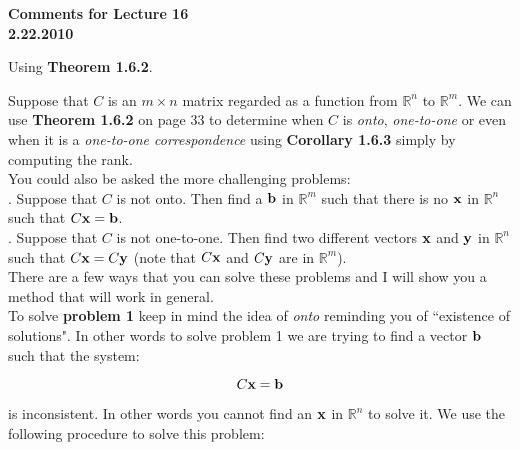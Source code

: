 \documentclass[12pt]{article}
\begin{document}
\begin{center}
{\large \bf Comments for Lecture 16}\\
\bf{2.22.2010}
\end{center}

\begin{center}
Using {\bf Theorem 1.6.2}.
\end{center}

\noindent Suppose that $C$ is an $m\times n$ matrix regarded as a function from $\mathbb{R}^n$ to $\mathbb{R}^m$.  We can use {\bf Theorem 1.6.2} on page 33 to determine when $C$ is {\it onto}, {\it one-to-one} or even when it is a {\it one-to-one correspondence} using {\bf Corollary 1.6.3} simply by computing the rank.\\

\noindent You could also be asked the more challenging problems:\\

.  Suppose that $C$ is not onto.  Then find a ${\bf b}$ in $\mathbb{R}^m$ such that there is no ${\bf x}$ in $\mathbb{R}^n$ such that $C{\bf x} = {\bf b}$.  \\

.  Suppose that $C$ is not one-to-one.  Then find two different vectors ${\bf x}$ and ${\bf y}$ in $\mathbb{R}^n$ such that $C{\bf x}=C{\bf y}$ (note that $C{\bf x}$ and $C{\bf y}$ are in $\mathbb{R}^m$). \\

\noindent There are a few ways that you can solve these problems and I will show you a method that will work in general.\\

\noindent To solve {\bf problem 1} keep in mind the idea of {\it onto} reminding you of ``existence of solutions".  In other words to solve problem 1 we are trying to find a vector ${\bf b}$ such that the system:

\[C{\bf x} = {\bf b}  \]

\noindent is inconsistent.  In other words you cannot find an ${\bf x}$ in $\mathbb{R}^n$ to solve it.  We use the following procedure to solve this problem:
\end{document}
